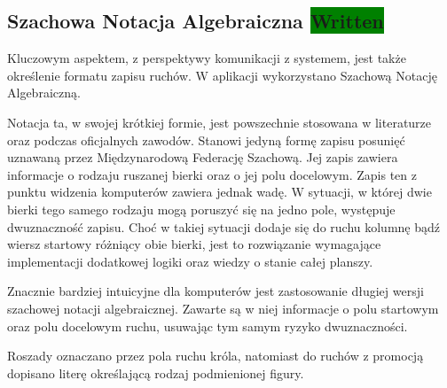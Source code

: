 \subsection{Szachowa Notacja Algebraiczna \colorbox{green}{Written}}
\label{subsec:notacja-algebraiczna}

Kluczowym aspektem, z perspektywy komunikacji z systemem, jest także określenie formatu zapisu ruchów.
W aplikacji wykorzystano Szachową Notację Algebraiczną.

Notacja ta, w swojej krótkiej formie, jest powszechnie stosowana w literaturze oraz podczas oficjalnych zawodów.
Stanowi jedyną formę zapisu posunięć uznawaną przez Międzynarodową Federację Szachową.
Jej zapis zawiera informacje o rodzaju ruszanej bierki oraz o jej polu docelowym.
Zapis ten z punktu widzenia komputerów zawiera jednak wadę.
W sytuacji, w której dwie bierki tego samego rodzaju mogą poruszyć się na jedno pole, występuje dwuznaczność zapisu.
Choć w takiej sytuacji dodaje się do ruchu kolumnę bądź wiersz startowy różniący obie bierki, jest to rozwiązanie wymagające implementacji dodatkowej logiki oraz wiedzy o stanie całej planszy.

Znacznie bardziej intuicyjne dla komputerów jest zastosowanie długiej wersji szachowej notacji algebraicznej.
Zawarte są w niej informacje o polu startowym oraz polu docelowym ruchu, usuwając tym samym ryzyko dwuznaczności.

Roszady oznaczano przez pola ruchu króla, natomiast do ruchów z promocją dopisano literę określającą rodzaj podmienionej figury.

